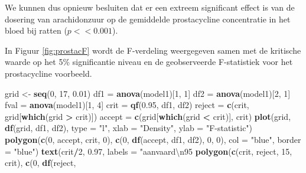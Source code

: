 \documentclass[12pt,dutch,coursenotes]{book}
\newenvironment{Shaded}{\begin{snugshade}}{\end{snugshade}}
\newcommand{\KeywordTok}[1]{\textcolor[rgb]{0.13,0.29,0.53}{\textbf{#1}}}
\newcommand{\DataTypeTok}[1]{\textcolor[rgb]{0.13,0.29,0.53}{#1}}
\newcommand{\DecValTok}[1]{\textcolor[rgb]{0.00,0.00,0.81}{#1}}
\newcommand{\FloatTok}[1]{\textcolor[rgb]{0.00,0.00,0.81}{#1}}
\newcommand{\CharTok}[1]{\textcolor[rgb]{0.31,0.60,0.02}{#1}}
\newcommand{\StringTok}[1]{\textcolor[rgb]{0.31,0.60,0.02}{#1}}
\newcommand{\OperatorTok}[1]{\textcolor[rgb]{0.81,0.36,0.00}{\textbf{#1}}}
\newcommand{\NormalTok}[1]{#1}
\theoremstyle{definition}
\theoremstyle{definition}
\theoremstyle{definition}
\theoremstyle{remark}
\begin{document}
We kunnen dus opnieuw besluiten dat er een extreem significant effect is
van de dosering van arachidonzuur op de gemiddelde prostacycline
concentratie in het bloed bij ratten (\(p<<0.001\)).

In Figuur \ref{fig:prostacF} wordt de F-verdeling weergegeven samen met
de kritische waarde op het 5\% significantie niveau en de geobserveerde
F-statistiek voor het prostacycline voorbeeld.

\begin{Shaded}
\begin{Highlighting}[]
\NormalTok{grid <-}\StringTok{ }\KeywordTok{seq}\NormalTok{(}\DecValTok{0}\NormalTok{, }\DecValTok{17}\NormalTok{, }\FloatTok{0.01}\NormalTok{)}
\NormalTok{df1 =}\StringTok{ }\KeywordTok{anova}\NormalTok{(model1)[}\DecValTok{1}\NormalTok{, }\DecValTok{1}\NormalTok{]}
\NormalTok{df2 =}\StringTok{ }\KeywordTok{anova}\NormalTok{(model1)[}\DecValTok{2}\NormalTok{, }\DecValTok{1}\NormalTok{]}
\NormalTok{fval =}\StringTok{ }\KeywordTok{anova}\NormalTok{(model1)[}\DecValTok{1}\NormalTok{, }\DecValTok{4}\NormalTok{]}
\NormalTok{crit =}\StringTok{ }\KeywordTok{qf}\NormalTok{(}\FloatTok{0.95}\NormalTok{, df1, df2)}
\NormalTok{reject =}\StringTok{ }\KeywordTok{c}\NormalTok{(crit, grid[}\KeywordTok{which}\NormalTok{(grid }\OperatorTok{>}\StringTok{ }\NormalTok{crit)])}
\NormalTok{accept =}\StringTok{ }\KeywordTok{c}\NormalTok{(grid[}\KeywordTok{which}\NormalTok{(grid }\OperatorTok{<}\StringTok{ }\NormalTok{crit)], crit)}
\KeywordTok{plot}\NormalTok{(grid, }\KeywordTok{df}\NormalTok{(grid, df1, df2), }\DataTypeTok{type =} \StringTok{"l"}\NormalTok{, }\DataTypeTok{xlab =} \StringTok{"Density"}\NormalTok{, }
    \DataTypeTok{ylab =} \StringTok{"F-statistic"}\NormalTok{)}
\KeywordTok{polygon}\NormalTok{(}\KeywordTok{c}\NormalTok{(}\DecValTok{0}\NormalTok{, accept, crit, }\DecValTok{0}\NormalTok{), }\KeywordTok{c}\NormalTok{(}\DecValTok{0}\NormalTok{, }\KeywordTok{df}\NormalTok{(accept, df1, }
\NormalTok{    df2), }\DecValTok{0}\NormalTok{, }\DecValTok{0}\NormalTok{), }\DataTypeTok{col =} \StringTok{"blue"}\NormalTok{, }\DataTypeTok{border =} \StringTok{"blue"}\NormalTok{)}
\KeywordTok{text}\NormalTok{(crit}\OperatorTok{/}\DecValTok{2}\NormalTok{, }\FloatTok{0.97}\NormalTok{, }\DataTypeTok{labels =} \StringTok{"aanvaard}\CharTok{\textbackslash{}n}\StringTok{95%"}\NormalTok{, }\DataTypeTok{col =} \StringTok{"blue"}\NormalTok{)}
\KeywordTok{polygon}\NormalTok{(}\KeywordTok{c}\NormalTok{(crit, reject, }\DecValTok{15}\NormalTok{, crit), }\KeywordTok{c}\NormalTok{(}\DecValTok{0}\NormalTok{, }\KeywordTok{df}\NormalTok{(reject, }
}
\end{Highlighting}
\end{Shaded}
\end{document}
